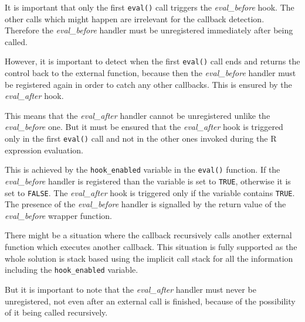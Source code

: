 \documentclass[thesis=M,english,hidelinks]{FITthesis}[2012/10/20]
\begin{document}
			It is important that only the first \lstinline|eval()| call triggers the \emph{eval\_before} hook. The other calls which might happen are irrelevant for the callback detection. Therefore the \emph{eval\_before} handler must be unregistered immediately after being called.\par
			
			However, it is important to detect when the first \lstinline|eval()| call ends and returns the control back to the external function, because then the \emph{eval\_before} handler must be registered again in order to catch any other callbacks. This is ensured by the \emph{eval\_after} hook.\par
			
			This means that the \emph{eval\_after} handler cannot be unregistered unlike the \emph{eval\_before} one. But it must be ensured that the \emph{eval\_after} hook is triggered only in the first \lstinline|eval()| call and not in the other ones invoked during the R expression evaluation.\par
			
			This is achieved by the \lstinline|hook_enabled| variable in the \lstinline|eval()| function. If the \emph{eval\_before} handler is registered than the variable is set to \lstinline|TRUE|, otherwise it is set to \lstinline|FALSE|. The \emph{eval\_after} hook is triggered only if the variable contains \lstinline|TRUE|. The presence of the \emph{eval\_before} handler is signalled by the return value of the \emph{eval\_before} wrapper function.\par
			
			There might be a situation where the callback recursively calls another external function which executes another callback. This situation is fully supported as the whole solution is stack based using the implicit call stack for all the information including the \lstinline|hook_enabled| variable.\par
			
			But it is important to note that the \emph{eval\_after} handler must never be unregistered, not even after an external call is finished, because of the possibility of it being called recursively.\par
			
\end{document}
